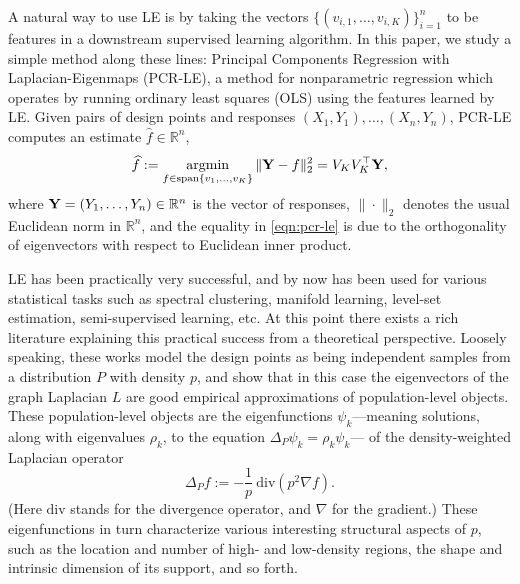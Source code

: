 \documentclass{article}
\theoremstyle{definition}
\newcommand{\argmin}{\mathop{\mathrm{argmin}}}
\def\R{\mathbb{R}}
\newcommand{\wh}[1]{\widehat{#1}}
\newcommand{\Reals}{\mathbb{R}} %
\newcommand{\1}{\mathbf{1}}
\begin{document}
	A natural way to use LE is by taking the vectors $\{(v_{i,1},\ldots,v_{i,K})\}_{i = 1}^{n}$ to be features in a downstream supervised learning algorithm. In this paper, we study a simple method along these lines: Principal Components Regression with Laplacian-Eigenmaps (PCR-LE), a method for nonparametric regression which operates by running ordinary least squares (OLS) using the features learned by LE. Given pairs of design points and responses $(X_1,Y_1),\ldots, (X_n,Y_n)$, PCR-LE computes an estimate $\wh{f} \in \Reals^n$,
	\begin{equation}
	\label{eqn:pcr-le}
	\wh{f} := \argmin_{f \in \mathrm{span}\{v_1,\ldots,v_K\}} \|{\bf Y} - f\|_2^2 = V_K V_K^{\top} {\bf Y},
	\end{equation}
	where ${\bf Y} = (Y_1,\ldots,Y_n) \in \Reals^n$ is the vector of responses, $\|\cdot\|_2$ denotes the usual Euclidean norm in $\Reals^n$, and the equality in \eqref{eqn:pcr-le} is due to the orthogonality of eigenvectors with respect to Euclidean inner product. 
	
	LE has been practically very successful, and by now has been used for various statistical tasks such as spectral clustering, manifold learning, level-set estimation, semi-supervised learning, etc. At this point there exists a rich literature \citep{koltchinskii2000,belkin07,vonluxburg2008,burago2014,shi2015,singer2017,garciatrillos18,trillos2019, calder2019, cheng2021,dunson2021} explaining this practical success from a theoretical perspective. Loosely speaking, these works model the design points as being independent samples from a distribution $P$ with density $p$, and show that in this case the eigenvectors of the graph Laplacian $L$ are good empirical approximations of population-level objects. These population-level objects are the eigenfunctions $\psi_k$---meaning solutions, along with eigenvalues $\rho_k$, to the equation $\Delta_P \psi_k = \rho_k \psi_k$--- of the density-weighted Laplacian operator
	\begin{equation}
	\label{eqn:density-weighted-laplace}
	\Delta_Pf := -\frac{1}{p}~ \mathrm{div}(p^2 \nabla f).
	\end{equation}  
	(Here $\mathrm{div}$ stands for the divergence operator, and $\nabla$ for the gradient.) These eigenfunctions in turn characterize various interesting structural aspects of $p$, such as the location and number of high- and low-density regions, the shape and intrinsic dimension of its support, and so forth.
	
\end{document}
